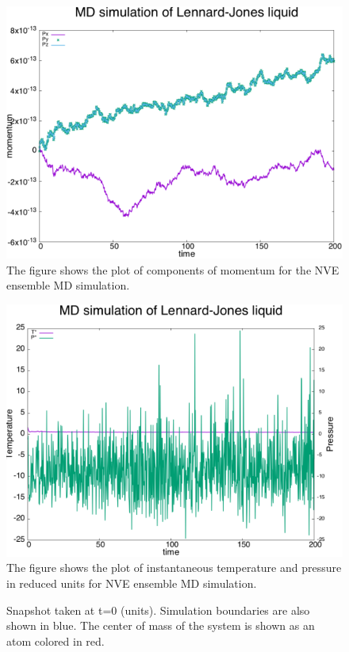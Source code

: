 \documentclass{article}
\begin{document}
\begin{figure}[htb]
\centering
\includegraphics[width=.9\linewidth]{./P2/LDmj_sim_mom.png}
\caption{\label{fig:2b}The figure shows the plot of components of momentum for the NVE ensemble MD simulation.}
\end{figure}

\begin{figure}[htb]
\centering
\includegraphics[width=.9\linewidth]{./P2/LDmj_sim_temp_P.png}
\caption{\label{fig:2c}The figure shows the plot of instantaneous temperature and pressure in reduced units for NVE ensemble MD simulation.}
\end{figure}


\begin{figure}[H]
\begin{centering}
\caption{Snapshot taken at t=0 (units). Simulation boundaries are also shown in blue. The center of mass of the system is shown as an atom colored in red.}
\label{fig:fig2d}
\end{centering}
\end{figure}
\end{document}
